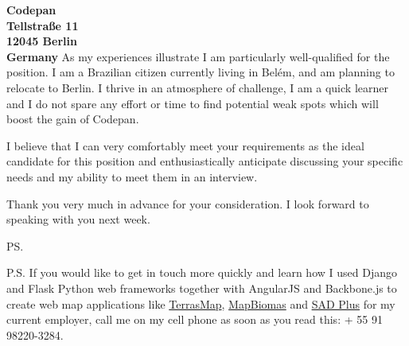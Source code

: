 \documentclass[a4paper]{joaosoares-letter}
\begin{document}
\begin{letter}{\bfseries Codepan\\Tellstraße 11\\12045 Berlin\\Germany}
As my experiences illustrate I am particularly well-qualified for the position. I am a Brazilian citizen currently living in Belém, and am planning to relocate to Berlin. I thrive in an atmosphere of challenge, I am a quick learner and I do not spare any effort or time to find potential weak spots which will boost the gain of Codepan.

I believe that I can very comfortably meet your requirements as the ideal candidate for this position and enthusiastically anticipate discussing your specific needs and my ability to meet them in an interview. 


\closing{Thank you very much in advance for your consideration. I look forward to speaking with you next week.}
\vspace{10pt}
\ps

P.S. If you would like to get in touch more quickly and learn how I used Django and Flask Python web frameworks together with AngularJS and Backbone.js to create web map applications like \href{https://goo.gl/6gUzPA}{TerrasMap}, \href{https://goo.gl/eYX5SW}{MapBiomas} and \href{https://goo.gl/2J41hR}{SAD Plus} for my current employer, call me on my cell phone as soon as you read this: + 55 91 98220-3284.
\vspace{\fill}

\end{letter}
\end{document}
